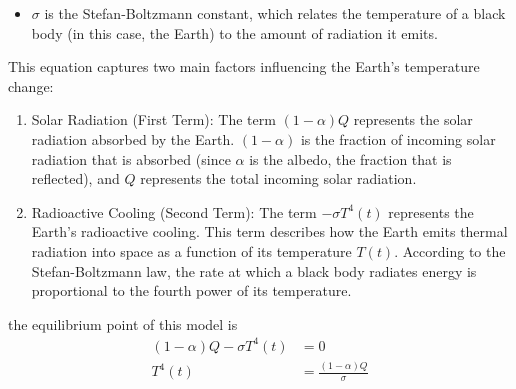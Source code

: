 \documentclass[]{article}
\begin{document}
\begin{itemize}
    \item $\sigma$ is the Stefan-Boltzmann constant, which relates the temperature of a black body (in this case, the Earth) to the amount of radiation it emits.
\end{itemize}
\newpage
This equation captures two main factors influencing the Earth's temperature change:
\begin{enumerate}
    \item Solar Radiation (First Term): The term $(1-\alpha)Q$ represents the solar radiation absorbed by the Earth.
    $(1-\alpha)$ is the fraction of incoming solar radiation that is absorbed (since $\alpha$ is the albedo, the fraction that is reflected), 
    and $Q$ represents the total incoming solar radiation.
    \item Radioactive Cooling (Second Term): The term $-\sigma T^4(t)$ represents the Earth's radioactive cooling. 
    This term describes how the Earth emits thermal radiation into space as a function of its temperature $T(t)$. 
    According to the Stefan-Boltzmann law, the rate at which a black body radiates energy is proportional to the fourth power of its temperature.
\end{enumerate}


the equilibrium point of this model is
\begin{align*}
    (1-\alpha)Q - \sigma T^4(t) &= 0
    \\
    T^4(t) &= \frac{(1-\alpha)Q}{\sigma}
\end{align*}
\end{document}
